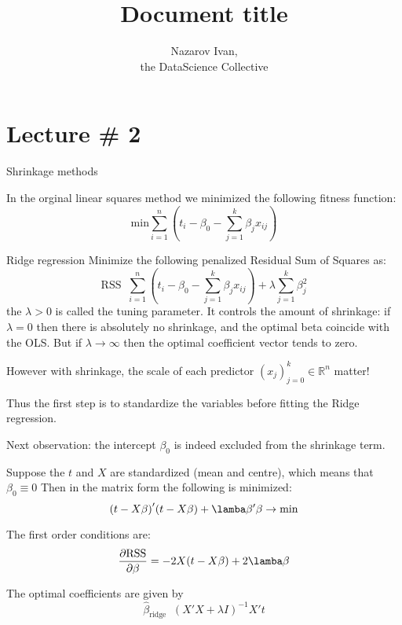 \documentclass[a4paper]{article}
\title{Document title}
\author{Nazarov Ivan, \rus{101мНОД(ИССА)}\\the DataScience Collective}
\newcommand{\brac}[1]{{\left ( #1 \right )}}
\newcommand{\Real}{\mathbb{R}}
\newcommand{\defn}{\mathop{\overset{\Delta}{=}}\nolimits}
\begin{document}
\maketitle


\section{Lecture \# 2} %
\label{sec:lecture_2}

Shrinkage methods

In the orginal linear squares method we minimized the following fitness function:
\[\text{min} \sum_{i=1}^n \brac{t_i - \beta_0 - \sum_{j=1}^k \beta_j x_{ij}}\]

Ridge regression
Minimize the following penalized Residual Sum of Squares as:
\[\text{RSS}\defn \sum_{i=1}^n \brac{t_i - \beta_0 - \sum_{j=1}^k \beta_j x_{ij}} + \lambda \sum_{j=1}^k \beta_j^2\]
the $\lambda>0$ is called the tuning parameter.
It controls the amount of shrinkage:
if $\lambda = 0$ then there is absolutely no shrinkage, and the optimal beta coincide with the OLS.
But if $\lambda\to \infty$ then the optimal coefficient vector tends to zero. 

However with shrinkage, the scale of each predictor $\brac{x_j}_{j=0}^k\in \Real^n$ matter!

Thus the first step is to standardize the variables before fitting the Ridge regression.

Next observation: the intercept $\beta_0$ is indeed excluded from the shrinkage term.

Suppose the $t$ and $X$ are standardized (mean and centre), which means that $\beta_0 \equiv 0$
Then in the matrix form the following is minimized:
\[\brac{t-X\beta}'\brac{t- X\beta} + \lamba \beta'\beta \to \text{min}\]

The first order conditions are:
\begin{align*}
	\frac{\partial \text{RSS}}{\partial \beta } &= -2 X\brac{t-X\beta}+2\lamba \beta\\
\end{align*}

The optimal coefficients are given by
\[\hat{\beta}_\text{ridge}\defn \brac{X'X + \lambda I}^{-1}X't\]


\end{document}

